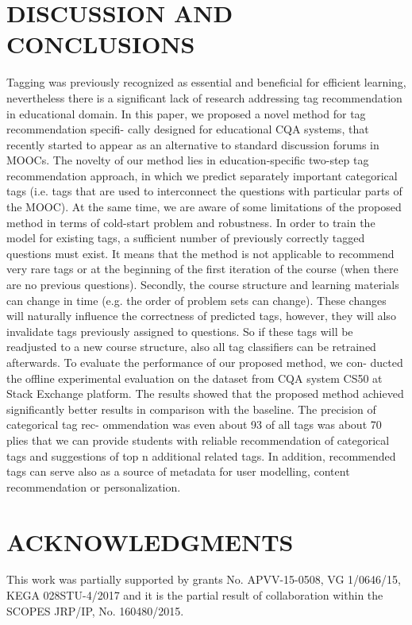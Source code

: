 \documentclass{sig-alternate}
\begin{document}
\section{DISCUSSION AND CONCLUSIONS
}
Tagging was previously recognized as essential and beneficial for
efficient learning, nevertheless there is a significant lack of research
addressing tag recommendation in educational domain. In this
paper, we proposed a novel method for tag recommendation specifi-
cally designed for educational CQA systems, that recently started to
appear as an alternative to standard discussion forums in MOOCs.
The novelty of our method lies in education-specific two-step
tag recommendation approach, in which we predict separately
important categorical tags (i.e. tags that are used to interconnect
the questions with particular parts of the MOOC). At the same time,
we are aware of some limitations of the proposed method in terms
of cold-start problem and robustness. In order to train the model
for existing tags, a sufficient number of previously correctly tagged
questions must exist. It means that the method is not applicable to
recommend very rare tags or at the beginning of the first iteration
of the course (when there are no previous questions). Secondly, the
course structure and learning materials can change in time (e.g. the
order of problem sets can change). These changes will naturally
influence the correctness of predicted tags, however, they will also
invalidate tags previously assigned to questions. So if these tags
will be readjusted to a new course structure, also all tag classifiers
can be retrained afterwards.
To evaluate the performance of our proposed method, we con-
ducted the offline experimental evaluation on the dataset from
CQA system CS50 at Stack Exchange platform. The results showed
that the proposed method achieved significantly better results in
comparison with the baseline. The precision of categorical tag rec-
ommendation was even about 93%
of all tags was about 70%
plies that we can provide students with reliable recommendation of
categorical tags and suggestions of top n additional related tags. In
addition, recommended tags can serve also as a source of metadata
for user modelling, content recommendation or personalization.

\setcounter{secnumdepth}{0} %
\section{ACKNOWLEDGMENTS
}This work was partially supported by grants No. APVV-15-0508,
VG 1/0646/15, KEGA 028STU-4/2017 and it is the partial result of
collaboration within the SCOPES JRP/IP, No. 160480/2015.
\end{document}
